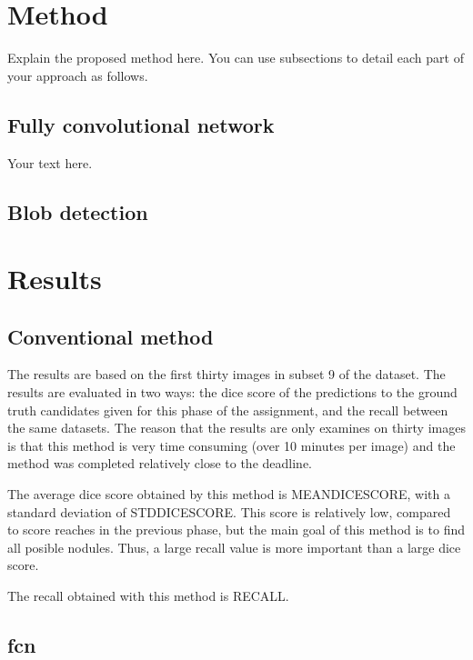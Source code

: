 \documentclass{article}
\begin{document}
\section{Method}\label{sec:method}
Explain the proposed method here.
You can use subsections to detail each part of your approach as follows. 
\subsection{Fully convolutional network}
Your text here.

\subsection{Blob detection}




\section{Results}\label{sec:results}
\subsection{Conventional method}
The results are based on the first thirty images in subset 9 of the dataset. The results are evaluated in two ways: the dice score of the predictions to the ground truth candidates given for this phase of the assignment, and the recall between the same datasets. The reason that the results are only examines on thirty images is that this method is very time consuming (over 10 minutes per image) and the method was completed relatively close to the deadline.

The average dice score obtained by this method is MEANDICESCORE, with a standard deviation of STDDICESCORE. This score is relatively low, compared to score reaches in the previous phase, but the main goal of this method is to find all posible nodules. Thus, a large recall value is more important than a large dice score.

The recall obtained with this method is RECALL.
\subsection{fcn}

\end{document}
